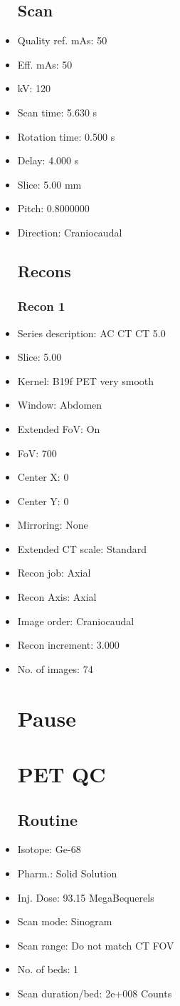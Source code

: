 \documentclass[12pt]{article}
\begin{document}
\begin{itemize}[noitemsep]
\subsection{Scan}
\item Quality ref. mAs: 50\item Eff. mAs: 50\item kV: 120\item Scan time: 5.630 s\item Rotation time: 0.500 s\item Delay: 4.000 s\item Slice: 5.00 mm\item Pitch: 0.8000000\item Direction: Craniocaudal\subsection{Recons}

\subsubsection{Recon 1}
\item Series description: AC CT CT 5.0
\item Slice: 5.00
\item Kernel: B19f PET very smooth
\item Window: Abdomen
\item Extended FoV: On
\item FoV: 700
\item Center X: 0
\item Center Y: 0
\item Mirroring: None
\item Extended CT scale: Standard
\item Recon job: Axial
\item Recon Axis: Axial
\item Image order: Craniocaudal
\item Recon increment: 3.000
\item No. of images: 74
\section{Pause}
\section{PET QC}\subsection{Routine}
\item Isotope: Ge-68
\item Pharm.: Solid Solution
\item Inj. Dose: 93.15 MegaBequerels
\item Scan mode: Sinogram
\item Scan range: Do not match CT FOV
\item No. of beds: 1
\item Scan duration/bed: 2e+008 Counts

\end{itemize}
\end{document}
